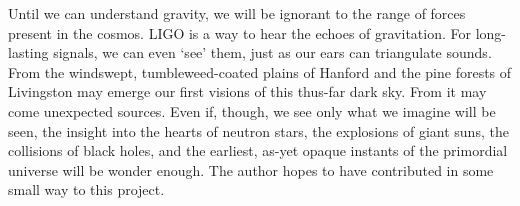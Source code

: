 Until we can understand gravity, we will be ignorant to the range of forces present in the cosmos.
LIGO is a way to hear the echoes of gravitation.
For long-lasting signals, we can even `see' them, just as our ears can triangulate sounds.
 From the windswept, tumbleweed-coated plains of Hanford and the pine forests of Livingston may emerge our first visions of this thus-far dark sky. 
From it may come unexpected sources. 
Even if, though, we see only what we imagine will be seen, the insight into the hearts of neutron stars, the explosions of giant suns, the collisions of black holes, and the earliest, as-yet opaque instants of the primordial universe will be wonder enough. 
The author hopes to have contributed in some small way to this project. 

  

%
%
%

